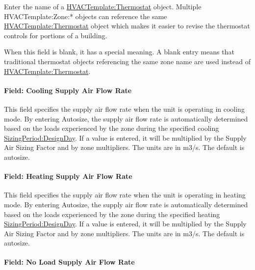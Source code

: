 Enter the name of a \hyperref[hvactemplatethermostat]{HVACTemplate:Thermostat} object. Multiple HVACTemplate:Zone:* objects can reference the same \hyperref[hvactemplatethermostat]{HVACTemplate:Thermostat} object which makes it easier to revise the thermostat controls for portions of a building.

When this field is blank, it has a special meaning. A blank entry means that traditional thermostat objects referencing the same zone name are used instead of \hyperref[hvactemplatethermostat]{HVACTemplate:Thermostat}.

\paragraph{Field: Cooling Supply Air Flow Rate}\label{field-cooling-supply-air-flow-rate-2}

This field specifies the supply air flow rate when the unit is operating in cooling mode. By entering Autosize, the supply air flow rate is automatically determined based on the loads experienced by the zone during the specified cooling \hyperref[sizingperioddesignday]{SizingPeriod:DesignDay}. If a value is entered, it will be multiplied by the Supply Air Sizing Factor and by zone multipliers. The units are in m3/s. The default is autosize.

\paragraph{Field: Heating Supply Air Flow Rate}\label{field-heating-supply-air-flow-rate-2}

This field specifies the supply air flow rate when the unit is operating in heating mode. By entering Autosize, the supply air flow rate is automatically determined based on the loads experienced by the zone during the specified heating \hyperref[sizingperioddesignday]{SizingPeriod:DesignDay}. If a value is entered, it will be multiplied by the Supply Air Sizing Factor and by zone multipliers. The units are in m3/s. The default is autosize.

\paragraph{Field: No Load Supply Air Flow Rate}\label{field-no-load-supply-air-flow-rate-2}

